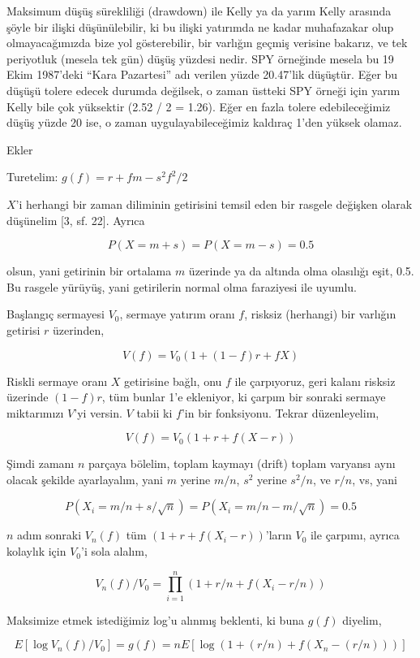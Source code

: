 \documentclass[12pt,fleqn]{article}\usepackage{../../common}
\begin{document}
Maksimum düşüş sürekliliği (drawdown) ile Kelly ya da yarım Kelly arasında
şöyle bir ilişki düşünülebilir, ki bu ilişki yatırımda ne kadar muhafazakar
olup olmayacağımızda bize yol gösterebilir, bir varlığın geçmiş verisine
bakarız, ve tek periyotluk (mesela tek gün) düşüş yüzdesi nedir. SPY
örneğinde mesela bu 19 Ekim 1987'deki ``Kara Pazartesi'' adı verilen yüzde
20.47'lik düşüştür. Eğer bu düşüşü tolere edecek durumda değilsek, o zaman
üstteki SPY örneği için yarım Kelly bile çok yüksektir (2.52 / 2 =
1.26). Eğer en fazla tolere edebileceğimiz düşüş yüzde 20 ise, o zaman
uygulayabileceğimiz kaldıraç 1'den yüksek olamaz. 

Ekler

Turetelim: $g(f) = r + fm - s^2f^2 / 2$

$X$'i herhangi bir zaman diliminin getirisini temsil eden bir rasgele
değişken olarak düşünelim [3, sf. 22]. Ayrıca

$$ P(X = m+s) = P(X = m-s) = 0.5$$

olsun, yani getirinin bir ortalama $m$ üzerinde ya da altında olma
olasılığı eşit, 0.5. Bu rasgele yürüyüş, yani getirilerin normal olma
faraziyesi ile uyumlu. 

Başlangıç sermayesi $V_0$, sermaye yatırım oranı $f$, risksiz (herhangi)
bir varlığın getirisi $r$ üzerinden,

$$ V(f) = V_0 (1 + (1-f)r + fX)  $$

Riskli sermaye oranı $X$ getirisine bağlı, onu $f$ ile çarpıyoruz, geri
kalanı risksiz üzerinde $(1-f)r$, tüm bunlar 1'e ekleniyor, ki çarpım bir
sonraki sermaye miktarımızı $V$'yi versin. $V$ tabii ki $f$'in bir
fonksiyonu. Tekrar düzenleyelim,

$$ V(f) = V_0 (1 + r + f(X - r))  $$

Şimdi zamanı $n$ parçaya bölelim, toplam kaymayı (drift) toplam varyansı
aynı olacak şekilde ayarlayalım, yani $m$ yerine $m / n$, $s^2$ yerine
$s^2/n$, ve $r/n$, vs, yani

$$ P(X_i = m/n + s/\sqrt{n}) = P(X_i = m/n - m/\sqrt{n}) = 0.5$$

$n$ adım sonraki $V_n(f)$ tüm $(1 + r + f(X_i - r))$'ların $V_0$ ile
çarpımı, ayrıca kolaylık için $V_0$'i sola alalım,

$$ V_n(f)/V_0 = \prod _{i=1}^{n} (1 + r/n + f(X_i - r/n))  $$

Maksimize etmek istediğimiz log'u alınmış beklenti, ki buna $g(f)$ diyelim,

$$ E[\log V_n(f)/V_0] = g(f) = n E[\log (1 + (r/n) + f(X_n - (r/n)))]  $$
\end{document}
